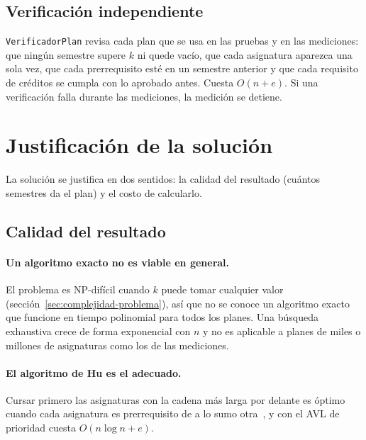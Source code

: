 \documentclass[11pt,letterpaper]{article}
\begin{document}
\subsection{Verificación independiente}
\texttt{VerificadorPlan} revisa cada plan que se usa en las pruebas y en las mediciones: que ningún semestre supere $k$ ni quede vacío, que cada asignatura aparezca una sola vez, que cada prerrequisito esté en un semestre anterior y que cada requisito de créditos se cumpla con lo aprobado antes. Cuesta $O(n + e)$. Si una verificación falla durante las mediciones, la medición se detiene.

\section{Justificación de la solución}\label{sec:justificacion}

La solución se justifica en dos sentidos: la calidad del resultado (cuántos semestres da el plan) y el costo de calcularlo.

\subsection{Calidad del resultado}
\paragraph{Un algoritmo exacto no es viable en general.} El problema es NP-difícil cuando $k$ puede tomar cualquier valor (sección~\ref{sec:complejidad-problema}), así que no se conoce un algoritmo exacto que funcione en tiempo polinomial para todos los planes. Una búsqueda exhaustiva crece de forma exponencial con $n$ y no es aplicable a planes de miles o millones de asignaturas como los de las mediciones.

\paragraph{El algoritmo de Hu es el adecuado.} Cursar primero las asignaturas con la cadena más larga por delante es óptimo cuando cada asignatura es prerrequisito de a lo sumo otra~\cite{hu1961}, y con el AVL de prioridad cuesta $O(n \log n + e)$.
\end{document}
